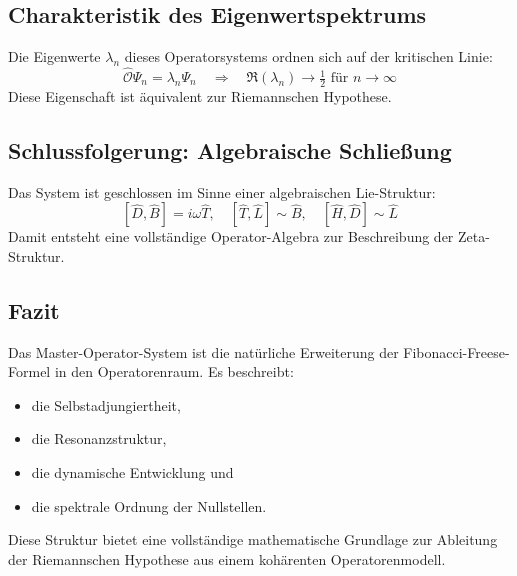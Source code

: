 \subsection{Charakteristik des Eigenwertspektrums}

Die Eigenwerte \(\lambda_n\) dieses Operatorsystems ordnen sich auf der kritischen Linie:
\[
\hat{\mathcal{O}} \Psi_n = \lambda_n \Psi_n
\quad \Rightarrow \quad
\Re(\lambda_n) \to \tfrac{1}{2} \text{ für } n \to \infty
\]
Diese Eigenschaft ist äquivalent zur Riemannschen Hypothese.

\subsection{Schlussfolgerung: Algebraische Schließung}

Das System ist geschlossen im Sinne einer algebraischen Lie-Struktur:
\[
[\hat{D}, \hat{B}] = i \omega \hat{T}, \quad
[\hat{T}, \hat{L}] \sim \hat{B}, \quad
[\hat{H}, \hat{D}] \sim \hat{L}
\]
Damit entsteht eine vollständige Operator-Algebra zur Beschreibung der Zeta-Struktur.

\subsection*{Fazit}

Das Master-Operator-System ist die natürliche Erweiterung der Fibonacci-Freese-Formel in den Operatorenraum. Es beschreibt:
\begin{itemize}
    \item die Selbstadjungiertheit,
    \item die Resonanzstruktur,
    \item die dynamische Entwicklung und
    \item die spektrale Ordnung der Nullstellen.
\end{itemize}

Diese Struktur bietet eine vollständige mathematische Grundlage zur Ableitung der Riemannschen Hypothese aus einem kohärenten Operatorenmodell.